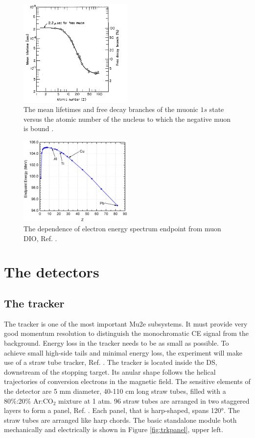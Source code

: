 \begin{figure}[!h]
\centering
\includegraphics[width =0.5\textwidth]{figures/png/lifetime_mu_matter.png}
\caption{ The mean lifetimes and free decay branches of the muonic $1s$ state versus the atomic number of the nucleus to which the negative muon is bound \cite{TYamazaki_1975}.}
\label{fig:muonicatom}
\end{figure}
\begin{figure}[!h]
\centering
\includegraphics[width =0.5\textwidth]{figures/png/endopint.png}
\caption{ The dependence of electron energy spectrum endpoint from muon DIO, Ref. \cite{dukes}.}
\label{fig:endpoint}
\end{figure}


\section{The detectors}
\subsection{The tracker}\label{trackersec}
The tracker is one of the most important Mu2e subsystems.
It must provide very good momentum resolution to distinguish the monochromatic CE signal from the background. 
Energy loss in the tracker needs to be as small as possible. 
To achieve small high-side tails and minimal energy loss, the experiment will make use of a straw tube tracker, Ref. \cite{bobbb}.
The tracker is located inside the DS, downstream of the stopping target. 
Its anular shape follows the helical trajectories of conversion electrons in the magnetic field. The sensitive elements of the detector are 5 mm diameter, 40-110 cm long straw tubes, filled with a 80\%:20\% Ar:CO$_2$ mixture at 1 atm.  96 straw tubes are arranged in 
two staggered layers to form a panel, Ref. \cite{bartoszek2015mu2e}. 
Each panel, that is harp-shaped, spans 120°. The straw tubes are arranged like harp chords. 
The basic standalone module both mechanically and electrically is 
shown in Figure \ref{fig:trkpanel}, upper left.
\\
  
